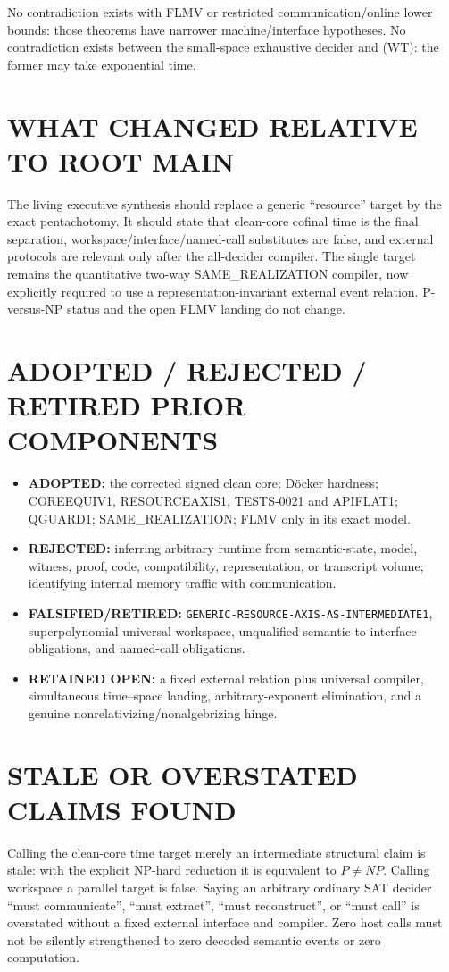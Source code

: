 \documentclass[11pt]{article}
\begin{document}
No contradiction exists with FLMV or restricted communication/online lower
bounds: those theorems have narrower machine/interface hypotheses.  No
contradiction exists between the small-space exhaustive decider and (WT): the
former may take exponential time.

\section{WHAT CHANGED RELATIVE TO ROOT MAIN}
The living executive synthesis should replace a generic ``resource'' target
by the exact pentachotomy.  It should state that clean-core cofinal time is the
final separation, workspace/interface/named-call substitutes are false, and
external protocols are relevant only after the all-decider compiler.  The
single target remains the quantitative two-way SAME\_REALIZATION compiler,
now explicitly required to use a representation-invariant external event
relation.  P-versus-NP status and the open FLMV landing do not change.

\section{ADOPTED / REJECTED / RETIRED PRIOR COMPONENTS}
\begin{itemize}[leftmargin=1.5em]
\item \textbf{ADOPTED:} the corrected signed clean core; D\"ocker hardness;
COREEQUIV1, RESOURCEAXIS1, TESTS-0021 and APIFLAT1; QGUARD1; SAME\_REALIZATION;
FLMV only in its exact model.
\item \textbf{REJECTED:} inferring arbitrary runtime from semantic-state,
model, witness, proof, code, compatibility, representation, or transcript
volume; identifying internal memory traffic with communication.
\item \textbf{FALSIFIED/RETIRED:}
\texttt{GENERIC-RESOURCE-AXIS-AS-INTERMEDIATE1}, superpolynomial universal
workspace, unqualified semantic-to-interface obligations, and named-call
obligations.
\item \textbf{RETAINED OPEN:} a fixed external relation plus universal
compiler, simultaneous time--space landing, arbitrary-exponent elimination,
and a genuine nonrelativizing/nonalgebrizing hinge.
\end{itemize}

\section{STALE OR OVERSTATED CLAIMS FOUND}
Calling the clean-core time target merely an intermediate structural claim is
stale: with the explicit NP-hard reduction it is equivalent to $P\ne NP$.
Calling workspace a parallel target is false.  Saying an arbitrary ordinary
SAT decider ``must communicate'', ``must extract'', ``must reconstruct'', or
``must call'' is overstated without a fixed external interface and compiler.
Zero host calls must not be silently strengthened to zero decoded semantic
events or zero computation.
\end{document}
